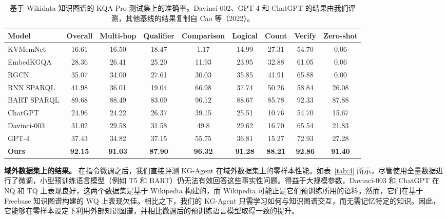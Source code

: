 \documentclass[11pt,UTF8,fontset=fandol]{ctexart}
\begin{document}
\begin{table}[H]\centering
\caption{基于 Wikidata 知识图谱的 KQA Pro 测试集上的准确率。Davinci-002、GPT-4 和 ChatGPT 的结果由我们评测，其他基线的结果复制自 Cao 等（2022）。}
\label{tab:3}
\setlength{\tabcolsep}{4pt}
\begin{tabular}{lcccccccc}
\toprule
Model & Overall & Multi-hop & Qualifier & Comparison & Logical & Count & Verify & Zero-shot \\
\midrule
KVMemNet     & 16.61 & 16.50 & 18.47 & 1.17  & 14.99 & 27.31 & 54.70 & 0.06  \\
EmbedKGQA    & 28.36 & 26.41 & 25.20 & 11.93 & 23.95 & 32.88 & 61.05 & 0.06  \\
RGCN         & 35.07 & 34.00 & 27.61 & 30.03 & 35.85 & 41.91 & 65.88 & 0.00  \\
RNN SPARQL   & 41.98 & 36.01 & 19.04 & 66.98 & 37.74 & 50.26 & 58.84 & 26.08 \\
BART SPARQL  & 89.68 & 88.49 & 83.09 & 96.12 & 88.67 & 85.78 & 92.33 & 87.88 \\
ChatGPT      & 24.96 & 24.22 & 26.37 & 39.15 & 25.51 & 10.76 & 54.70 & 15.67 \\
Davinci-003  & 31.02 & 29.58 & 31.58 & 49.8  & 29.62 & 16.70 & 65.54 & 21.83 \\
GPT-4        & 37.43 & 34.82 & 37.15 & 55.75 & 36.81 & 15.27 & 72.93 & 27.28 \\
\textbf{Ours} & \textbf{92.15} & \textbf{91.03} & \textbf{87.90} & \textbf{96.32} & \textbf{91.28} & \textbf{88.21} & \textbf{92.86} & \textbf{91.40} \\
\bottomrule
\end{tabular}
\end{table}

\textbf{域外数据集上的结果。}
在指令微调之后，我们直接评测 KG-Agent 在域外数据集上的零样本性能。如表~\ref{tab:4} 所示，尽管使用全量数据进行了微调，小型预训练语言模型（例如 T5 和 BART）仍无法有效回答这些事实性问题。得益于大规模参数，Davinci-003 和 ChatGPT 在 NQ 和 TQ 上表现良好，这两个数据集是基于 Wikipedia 构建的，而 Wikipedia 可能正是它们预训练所用的语料。然而，它们在基于 Freebase 知识图谱构建的 WQ 上表现欠佳。相比之下，我们的 KG-Agent 只需学习如何与知识图谱交互，而无需记忆特定的知识。因此，它能够在零样本设定下利用外部知识图谱，并相比微调后的预训练语言模型取得一致的提升。
\end{document}

